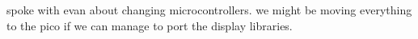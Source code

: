 spoke with evan about changing microcontrollers. we might be moving everything
to the pico if we can manage to port the display libraries.
